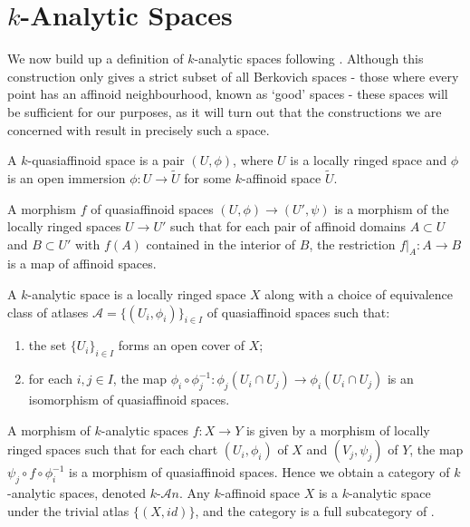 \section{$k$-Analytic Spaces}

We now build up a definition of $k$-analytic spaces following \parencite[\S 3.1]{berk1}. Although this construction only gives a strict subset of all Berkovich spaces - those where every point has an affinoid neighbourhood, known as `good' spaces - these spaces will be sufficient for our purposes, as it will turn out that the constructions we are concerned with result in precisely such a space.

\begin{defn}
    A $k$-quasiaffinoid space is a pair $(U, \phi)$, where $U$ is a locally ringed space and $\phi$ is an open immersion $\phi: U \to \tilde{U}$ for some $k$-affinoid space $\tilde{U}$.
\end{defn}

A morphism $f$ of quasiaffinoid spaces $(U, \phi) \to (U', \psi)$ is a morphism of the locally ringed spaces $U \to U'$ such that for each pair of affinoid domains $A \subset U$ and $B \subset U'$ with $f(A)$ contained in the interior of $B$, the restriction $f\vert_{A} : A \to B$ is a map of affinoid spaces.

\begin{defn}
    A $k$-analytic space is a locally ringed space $X$ along with a choice of equivalence class of atlases $\mathcal{A} = \{(U_i, \phi_i)\}_{i \in I}$ of quasiaffinoid spaces such that:
    \begin{enumerate}
        \item the set $\{U_i\}_{i \in I}$ forms an open cover of $X$;
        \item for each $i, j \in I$, the map $\phi_i \circ \phi_j^{-1}: \phi_j(U_i \cap U_j) \to \phi_i(U_i \cap U_j) $ is an isomorphism of quasiaffinoid spaces.
    \end{enumerate}
\end{defn}

A morphism of $k$-analytic spaces $f: X \to Y$ is given by a morphism of locally ringed spaces such that for each chart $(U_i, \phi_i)$ of $X$ and $(V_j, \psi_j)$ of $Y$, the map $\psi_j \circ f \circ \phi_i^{-1}$ is a morphism of quasiaffinoid spaces. Hence we obtain a category of $k$-analytic spaces, denoted $k$-$\mathcal{A}n$. 
Any $k$-affinoid space $X$ is a $k$-analytic space under the trivial atlas $\{(X, id)\}$, and the category \kaff is a full subcategory of \kanl.


